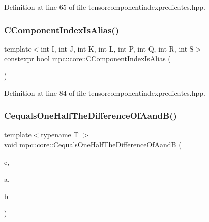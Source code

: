 Definition at line 65 of file tensorcomponentindexpredicates.\+hpp.

\mbox{\label{namespacempc_1_1core_aa712fe25e927caf0d63c2eb2673cd088}} 
\subsubsection{\texorpdfstring{C\+Component\+Index\+Is\+Alias()}{CComponentIndexIsAlias()}\hspace{0.1cm}{\footnotesize\ttfamily [4/4]}}
{\footnotesize\ttfamily template$<$int I, int J, int K, int L, int P, int Q, int R, int S$>$ \\
constexpr bool mpc\+::core\+::\+C\+Component\+Index\+Is\+Alias (\begin{DoxyParamCaption}{ }\end{DoxyParamCaption})\hspace{0.3cm}{\ttfamily [inline]}}



Definition at line 84 of file tensorcomponentindexpredicates.\+hpp.

\mbox{\label{namespacempc_1_1core_a7edf6d265fbe6e64e7d5065629b2cb56}} 
\subsubsection{\texorpdfstring{Cequals\+One\+Half\+The\+Difference\+Of\+Aand\+B()}{CequalsOneHalfTheDifferenceOfAandB()}}
{\footnotesize\ttfamily template$<$typename T $>$ \\
void mpc\+::core\+::\+Cequals\+One\+Half\+The\+Difference\+Of\+AandB (\begin{DoxyParamCaption}\item[{\mbox{\hyperlink{namespacempc_1_1core_ac3a232afc7c680d580628e834030482f}{mpc\+::core\+::\+Tensor\+Rank4\+Component}}$<$ T $>$ \&}]{c,  }\item[{\mbox{\hyperlink{namespacempc_1_1core_ac3a232afc7c680d580628e834030482f}{mpc\+::core\+::\+Tensor\+Rank4\+Component}}$<$ T $>$ \&}]{a,  }\item[{\mbox{\hyperlink{namespacempc_1_1core_ac3a232afc7c680d580628e834030482f}{mpc\+::core\+::\+Tensor\+Rank4\+Component}}$<$ T $>$ \&}]{b }\end{DoxyParamCaption})}



